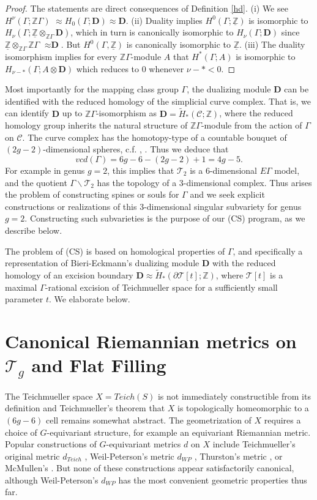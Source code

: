 \documentclass[12pt]{amsart}
\theoremstyle{definition}
\theoremstyle{remark}
\newcommand{\bZ}{\mathbb{Z}}
\newcommand{\del}{\partial}
\newcommand{\bD}{\textbf{D}}
\newcommand{\sC}{\mathscr{C}}
\newcommand{\sT}{\mathscr{T}}
\begin{document}
\begin{proof} 
The statements are direct consequences of Definition \ref{hd}. (i) We see $H^\nu(\Gamma; \bZ \Gamma)$ $\approx H_0(\Gamma; \bD)\approx \textbf{D}$. (ii) Duality implies $H^0(\Gamma; \underline{\bZ} )$ is isomorphic to $H_\nu(\Gamma; \underline{\bZ} \otimes_{\bZ \Gamma} \bD)$, which in turn is canonically isomorphic to $H_\nu(\Gamma; \bD)$ since $\underline{\bZ}\otimes_{\bZ \Gamma} \bZ \Gamma$ $\approx \bD$. But $H^0(\Gamma, \underline{\bZ})$ is canonically isomorphic to $\underline{\bZ}$. (iii) The duality isomorphism implies for every $\bZ \Gamma$-module $A$ that $H^*(\Gamma; A)$ is isomorphic to $H_{\nu-*}(\Gamma; A \otimes \bD)$ which reduces to $0$ whenever $\nu-*<0$.
\end{proof}

Most importantly for the mapping class group $\Gamma$, the dualizing module $\bD$ can be identified with the reduced homology of the simplicial curve complex. That is, we can identify $\bD$ up to $\bZ\Gamma$-isomorphism as $\bD=\tilde{H}_*(\sC;\bZ)$, where the reduced homology group inherits the natural structure of $\bZ \Gamma$-module from the action of $\Gamma$ on $\sC$. The curve complex has the homotopy-type of a countable bouquet of $(2g-2)$-dimensional spheres, c.f. \cite{ivanov2015virtual}, \cite{Harer1986}. Thus we deduce that $$vcd(\Gamma)=6g-6-(2g-2)+1=4g-5.$$ For example in genus $g=2$, this implies that $\sT_2$ is a $6$-dimensional $E\Gamma$ model, and the quotient $\Gamma \backslash \sT_2$ has the topology of a $3$-dimensional complex. Thus arises the problem of constructing spines or souls for $\Gamma$ and we seek explicit constructions or realizations of this $3$-dimensional singular subvariety for genus $g=2$. Constructing such subvarieties is the purpose of our (CS) program, as we describe below.

The problem of (CS) is based on homological properties of $\Gamma$, and specifically a representation of Bieri-Eckmann's dualizing module $\bD$ with the reduced homology of an excision boundary $\bD\approx \tilde{H}_*(\del \sT[t]; \bZ)$, where $\sT[t]$ is a maximal $\Gamma$-rational excision of Teichmueller space for a sufficiently small parameter $t$. We elaborate below.

\section{Canonical Riemannian metrics on $\sT_g$ and Flat Filling}\label{s2}
The Teichmueller space $X=Teich(S)$ is not immediately constructible from its definition and Teichmueller's theorem that $X$ is topologically homeomorphic to a $(6g-6)$ cell remains somewhat abstract. The geometrization of $X$ requires a choice of $G$-equivariant structure, for example an equivariant Riemannian metric. Popular constructions of $G$-equivariant metrics $d$ on $X$ include Teichmueller's original metric $d_{Teich}$ \cite{hubbard},  Weil-Peterson's metric $d_{WP}$ \cite{hubbard}, Thurston's metric \cite{wolpert1986a}, or McMullen's \cite{mcmullen2000moduli}. But none of these constructions appear satisfactorily canonical, although Weil-Peterson's $d_{WP}$ has the most convenient geometric properties thus far.
\end{document}
